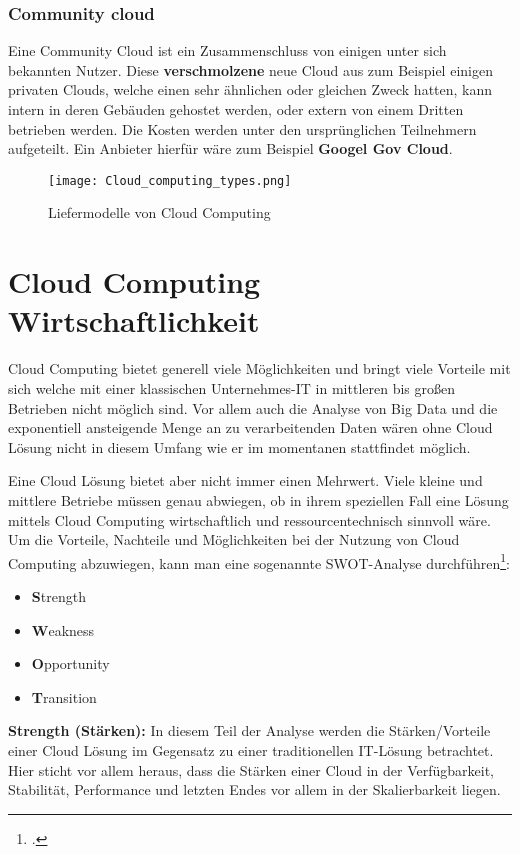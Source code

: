 \subsubsection{Community cloud}
Eine Community Cloud ist ein Zusammenschluss von einigen unter sich bekannten Nutzer.
Diese \textbf{verschmolzene} neue Cloud aus zum Beispiel einigen privaten Clouds, welche einen sehr ähnlichen oder gleichen Zweck hatten, kann intern in deren Gebäuden gehostet werden, oder extern von einem Dritten betrieben werden.
Die Kosten werden unter den ursprünglichen Teilnehmern aufgeteilt.
Ein Anbieter hierfür wäre zum Beispiel \textbf{Googel Gov Cloud}.
\begin{center}
    \begin{figure}[H]
        \centering
        \texttt{[image: Cloud\_computing\_types.png]}
        \caption{Liefermodelle von Cloud Computing}
    \end{figure}
\end{center}
\section{Cloud Computing Wirtschaftlichkeit}
Cloud Computing bietet generell viele Möglichkeiten und bringt viele Vorteile mit sich welche mit einer klassischen Unternehmes-IT in mittleren bis großen Betrieben nicht möglich sind.
Vor allem auch die Analyse von Big Data und die exponentiell ansteigende Menge an zu verarbeitenden Daten wären ohne Cloud Lösung nicht in diesem Umfang wie er im momentanen stattfindet möglich.

Eine Cloud Lösung bietet aber nicht immer einen Mehrwert. Viele kleine und mittlere Betriebe müssen genau abwiegen, ob in ihrem speziellen Fall eine Lösung mittels Cloud Computing wirtschaftlich und ressourcentechnisch sinnvoll wäre.
\newpage
Um die Vorteile, Nachteile und Möglichkeiten bei der Nutzung von Cloud Computing abzuwiegen, kann man eine sogenannte SWOT-Analyse
durchführen\footcite{Lehrunterlagen-HTL-cloud}:
\begin{itemize}
	\item \textbf{S}trength
	\item \textbf{W}eakness
	\item \textbf{O}pportunity
	\item \textbf{T}ransition
\end{itemize}

\textbf{Strength (Stärken):} In diesem Teil der Analyse werden die Stärken/Vorteile einer Cloud Lösung im Gegensatz zu einer traditionellen
IT-Lösung betrachtet. Hier sticht vor allem heraus, dass die Stärken einer Cloud in der Verfügbarkeit, Stabilität,
Performance und letzten Endes vor allem in der Skalierbarkeit liegen.

